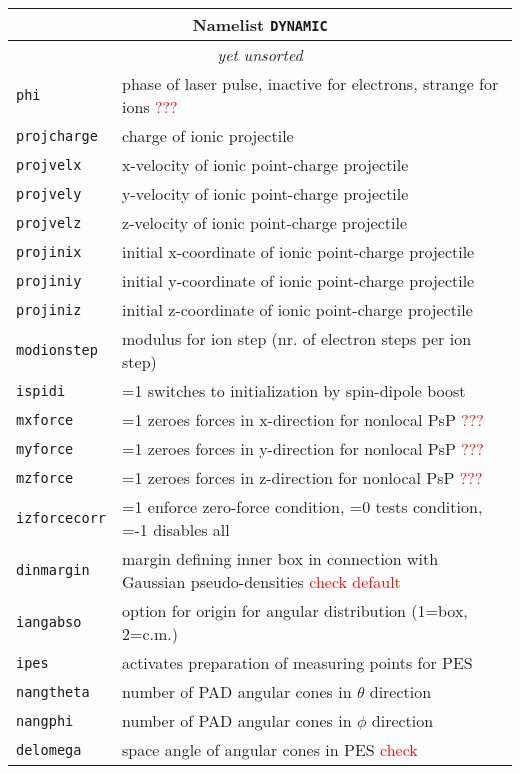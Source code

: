 \documentclass[12pt]{article}
\begin{document}
\begin{tabular}{ll}
\hline
\multicolumn{2}{c}{Namelist {\tt DYNAMIC}} in {\tt for005.<name>} \\
\hline
\multicolumn{2}{c}{\it yet unsorted} \\
\hline
{\tt phi} & phase of laser pulse, inactive for electrons, strange
for ions \textcolor{red}{???} \\
{\tt projcharge} &  charge of ionic projectile \\
{\tt projvelx} &  x-velocity of ionic point-charge  projectile\\
{\tt projvely} &  y-velocity of ionic point-charge  projectile  \\
{\tt projvelz} &  z-velocity of ionic point-charge  projectile  \\
{\tt projinix} &  initial x-coordinate of ionic point-charge projectile  \\
{\tt projiniy} &  initial y-coordinate of ionic point-charge  projectile  \\
{\tt projiniz} &  initial z-coordinate of ionic point-charge  projectile  \\
{\tt modionstep} & modulus for ion step (nr. of electron steps per ion
step)\\
{\tt ispidi} & =1  switches to initialization by spin-dipole boost\\
{\tt mxforce} & =1 zeroes forces in x-direction for nonlocal PsP \textcolor{red}{???} \\
{\tt myforce} & =1 zeroes forces in y-direction for nonlocal PsP \textcolor{red}{???}  \\
{\tt mzforce} & =1 zeroes forces in z-direction for nonlocal PsP \textcolor{red}{???}  \\
{\tt izforcecorr} & =1 enforce zero-force condition, =0 tests
condition, =-1 disables all  \\
{\tt dinmargin} & margin defining inner box in connection with
Gaussian pseudo-densities \textcolor{red}{check default}\\
{\tt iangabso} & option for origin for angular distribution (1=box,
2=c.m.) \\
{\tt ipes} & activates preparation of measuring points for PES \\
{\tt nangtheta} & number of PAD angular cones in $\theta$ direction \\
{\tt nangphi} &  number of PAD angular cones in $\phi$ direction \\
{\tt delomega} &  space angle of angular cones in PES \textcolor{red}{check}\\

\end{tabular}
\end{document}
